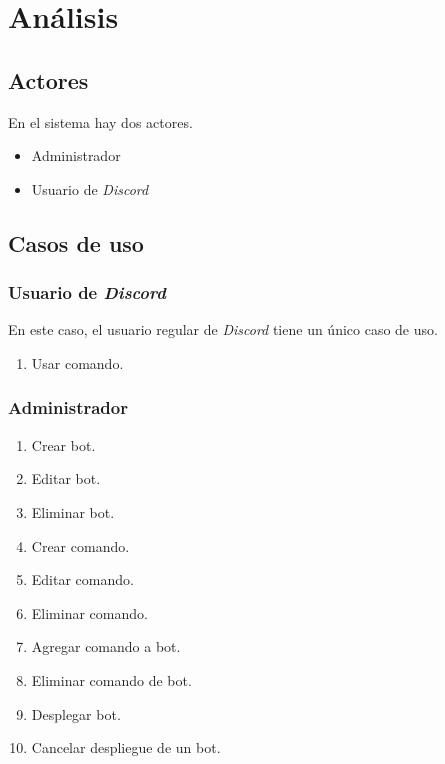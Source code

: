 \chapter{Análisis}

\section{Actores}

En el sistema hay dos actores.

\begin{itemize}
	\item Administrador
	\item Usuario de \textit{Discord}
\end{itemize}

\section{Casos de uso}

\subsection{Usuario de \textit{Discord}}

En este caso, el usuario regular de \textit{Discord} tiene un único caso de uso.

\begin{enumerate}
	\item Usar comando.
\end{enumerate}

\subsection{Administrador}

\begin{enumerate}
	\item Crear bot.
	\item Editar bot.
	\item Eliminar bot.
	\item Crear comando.
	\item Editar comando.
	\item Eliminar comando.
	\item Agregar comando a bot.
	\item Eliminar comando de bot.
	\item Desplegar bot.
	\item Cancelar despliegue de un bot.
\end{enumerate}


